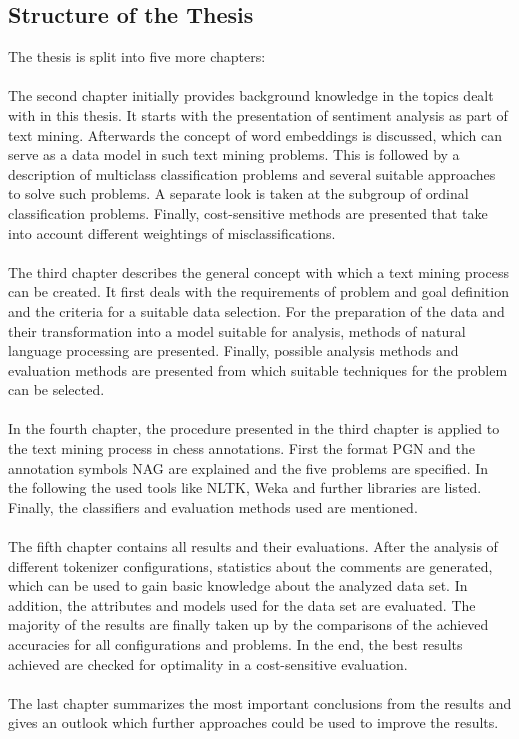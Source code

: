 \documentclass[article,type=msc,colorback,accentcolor=tud7b]{tudthesis}
\begin{document}
  \subsection{Structure of the Thesis}
    The thesis is split into five more chapters: \\\\
    The second chapter initially provides background knowledge in the topics dealt with in this thesis. It starts with the presentation of sentiment analysis as part of text mining. Afterwards the concept of word embeddings is discussed, which can serve as a data model in such text mining problems. This is followed by a description of multiclass classification problems and several suitable approaches to solve such problems. A separate look is taken at the subgroup of ordinal classification problems.  Finally, cost-sensitive methods are presented that take into account different weightings of misclassifications. \\\\
    The third chapter describes the general concept with which a text mining process can be created. It first deals with the requirements of problem and goal definition and the criteria for a suitable data selection. For the preparation of the data and their transformation into a model suitable for analysis, methods of natural language processing are presented. Finally, possible analysis methods and evaluation methods are presented from which suitable techniques for the problem can be selected. \\\\
    In the fourth chapter, the procedure presented in the third chapter is applied to the text mining process in chess annotations. First the format PGN and the annotation symbols NAG are explained and the five problems are specified. In the following the used tools like NLTK, Weka and further libraries are listed. Finally, the classifiers and evaluation methods used are mentioned. \\\\
    The fifth chapter contains all results and their evaluations. After the analysis of different tokenizer configurations, statistics about the comments are generated, which can be used to gain basic knowledge about the analyzed data set. In addition, the attributes and models used for the data set are evaluated. The majority of the results are finally taken up by the comparisons of the achieved accuracies for all configurations and problems. In the end, the best results achieved are checked for optimality in a cost-sensitive evaluation. \\\\
    The last chapter summarizes the most important conclusions from the results and gives an outlook which further approaches could be used to improve the results.
  \clearpage
  
\end{document}
